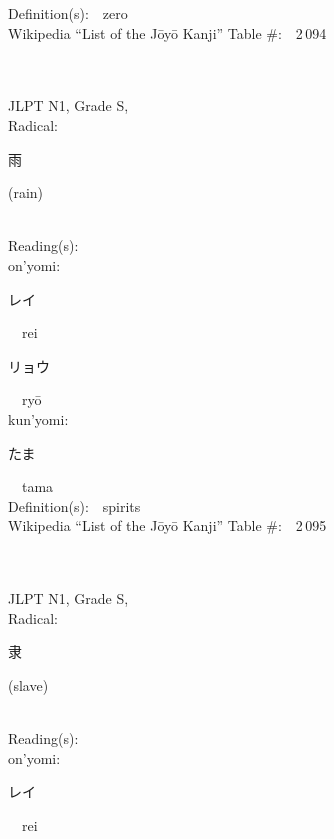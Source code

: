 \begin{multicols}{2}
Definition(s):\ \ zero \\
Wikipedia ``List of the J\=oy\=o Kanji'' Table \#:\ \ 2\,094 \\
\ \ \\
{\fontsize{34pt}{40pt}  }\ \ \\
{JLPT N1, Grade S, \\Radical:\ \ {\begin{CJK}{UTF8}{min} 雨 \end{CJK}} (rain) } \\
Reading(s):\ \ \\
{\hspace*{1em}}on'yomi:\ \ \\
{\hspace*{2em}}{\begin{CJK}{UTF8}{min} レイ \end{CJK}}\ \ rei\ \ \\
{\hspace*{2em}}{\begin{CJK}{UTF8}{min} リョウ \end{CJK}}\ \ ry\=o\ \ \\
{\hspace*{1em}}kun'yomi:\ \ \\
{\hspace*{2em}}{\begin{CJK}{UTF8}{min} たま \end{CJK}}\ \ tama\ \ \\
Definition(s):\ \ spirits \\
Wikipedia ``List of the J\=oy\=o Kanji'' Table \#:\ \ 2\,095 \\
\ \ \\
{\fontsize{34pt}{40pt}  }\ \ \\
{JLPT N1, Grade S, \\Radical:\ \ {\begin{CJK}{UTF8}{min} 隶 \end{CJK}} (slave) } \\
Reading(s):\ \ \\
{\hspace*{1em}}on'yomi:\ \ \\
{\hspace*{2em}}{\begin{CJK}{UTF8}{min} レイ\end{CJK}}\ \ rei\ \ \\

\end{multicols}
